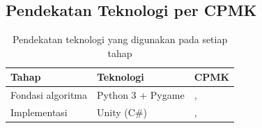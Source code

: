 \subsection{Pendekatan Teknologi per CPMK}

\begin{table}[htbp]
\centering
\caption{Pendekatan teknologi yang digunakan pada setiap tahap}
\label{tab:teknologi}
\begin{tabularx}{\textwidth}{@{}L{4.6cm} L{5.0cm} Y@{}}
\toprule
\headrow \textbf{Tahap} & \textbf{Teknologi} & \textbf{CPMK} \\
\midrule
Fondasi algoritma   & Python 3 + Pygame & ,  \\
Implementasi      & Unity (C\#)        & ,  \\
\bottomrule
\end{tabularx}
\end{table}
